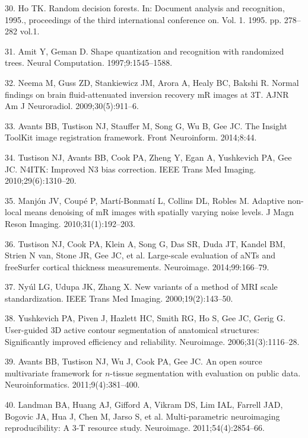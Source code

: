 \documentclass[11pt,]{article}
\begin{document}
\hypertarget{ref-ho1995}{}
30. Ho TK. Random decision forests. In: Document analysis and
recognition, 1995., proceedings of the third international conference
on. Vol. 1. 1995. pp. 278--282 vol.1.

\hypertarget{ref-amit1997}{}
31. Amit Y, Geman D. Shape quantization and recognition with randomized
trees. Neural Computation. 1997;9:1545--1588.

\hypertarget{ref-Neema:2009aa}{}
32. Neema M, Guss ZD, Stankiewicz JM, Arora A, Healy BC, Bakshi R.
Normal findings on brain fluid-attenuated inversion recovery mR images
at 3T. AJNR Am J Neuroradiol. 2009;30(5):911--6.

\hypertarget{ref-Avants:2014aa}{}
33. Avants BB, Tustison NJ, Stauffer M, Song G, Wu B, Gee JC. The
Insight ToolKit image registration framework. Front Neuroinform.
2014;8:44.

\hypertarget{ref-Tustison:2010ac}{}
34. Tustison NJ, Avants BB, Cook PA, Zheng Y, Egan A, Yushkevich PA, Gee
JC. N4ITK: Improved N3 bias correction. IEEE Trans Med Imaging.
2010;29(6):1310--20.

\hypertarget{ref-Manjon:2010aa}{}
35. Manjón JV, Coupé P, Martí-Bonmatí L, Collins DL, Robles M. Adaptive
non-local means denoising of mR images with spatially varying noise
levels. J Magn Reson Imaging. 2010;31(1):192--203.

\hypertarget{ref-Tustison:2014ab}{}
36. Tustison NJ, Cook PA, Klein A, Song G, Das SR, Duda JT, Kandel BM,
Strien N van, Stone JR, Gee JC, et al. Large-scale evaluation of aNTs
and freeSurfer cortical thickness measurements. Neuroimage.
2014;99:166--79.

\hypertarget{ref-nyul2000}{}
37. Nyúl LG, Udupa JK, Zhang X. New variants of a method of MRI scale
standardization. IEEE Trans Med Imaging. 2000;19(2):143--50.

\hypertarget{ref-Yushkevich:2006aa}{}
38. Yushkevich PA, Piven J, Hazlett HC, Smith RG, Ho S, Gee JC, Gerig G.
User-guided 3D active contour segmentation of anatomical structures:
Significantly improved efficiency and reliability. Neuroimage.
2006;31(3):1116--28.

\hypertarget{ref-Avants:2011aa}{}
39. Avants BB, Tustison NJ, Wu J, Cook PA, Gee JC. An open source
multivariate framework for \(n\)-tissue segmentation with evaluation on
public data. Neuroinformatics. 2011;9(4):381--400.

\hypertarget{ref-landman2011}{}
40. Landman BA, Huang AJ, Gifford A, Vikram DS, Lim IAL, Farrell JAD,
Bogovic JA, Hua J, Chen M, Jarso S, et al. Multi-parametric neuroimaging
reproducibility: A 3-T resource study. Neuroimage. 2011;54(4):2854--66.
\end{document}
